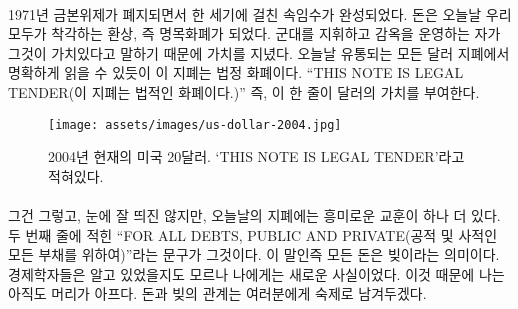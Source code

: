 \paragraph{}
\begin{comment}
	With the abolishment of the gold standard in 1971, this century-long
	sleight-of-hand was complete. Money became the illusion we all share to
	this day: fiat money. It is worth something because someone commanding
	an army and operating jails says it is wort능h something. As can be
	clearly read on every dollar note in circulation today, \enquote{THIS NOTE IS
		LEGAL TENDER}. In other words: It is valuable because the note says so.
\end{comment}
1971년 금본위제가 폐지되면서 한 세기에 걸친 속임수가 완성되었다. 
돈은 오늘날 우리 모두가 착각하는 환상, 즉 명목화폐가 되었다. 
군대를 지휘하고 감옥을 운영하는 자가 그것이 가치있다고 말하기 때문에 가치를 지녔다. 
오늘날 유통되는 모든 달러 지폐에서 명확하게 읽을 수 있듯이 이 지폐는 법정 화폐이다. 
\enquote{THIS NOTE IS LEGAL TENDER(이 지폐는 법적인 화폐이다.)}
즉, 이 한 줄이 달러의 가치를 부여한다.

\begin{comment}
	\begin{figure}
		\centering
		\texttt{[image: assets/images/us-dollar-2004.jpg]}
		\caption{A 2004 series U.S. twenty dollar note used today. `THIS NOTE IS LEGAL TENDER'}
		\label{fig:us-dollar-2004}
	\end{figure}
\end{comment}
\begin{figure}
	\centering
	\texttt{[image: assets/images/us-dollar-2004.jpg]}
	\caption{2004년 현재의 미국 20달러. `THIS NOTE IS LEGAL TENDER'라고 적혀있다.}
	\label{fig:us-dollar-2004}
\end{figure}

\paragraph{}
\begin{comment}
	By the way, there is another interesting lesson on today's bank notes,
	hidden in plain sight. The second line reads that this is legal tender
	\enquote{FOR ALL DEBTS, PUBLIC AND PRIVATE}. What might be obvious to economists
	was surprising to me: All money is debt. My head is still hurting
	because of it, and I will leave the exploration of the relation of money
	and debt as an exercise to the reader.
\end{comment}
그건 그렇고, 눈에 잘 띄진 않지만, 오늘날의 지폐에는 흥미로운 교훈이 하나 더 있다. 
두 번째 줄에 적힌 \enquote{FOR ALL DEBTS, PUBLIC AND PRIVATE(공적 및 사적인 모든 부채를 위하여)}라는 문구가 그것이다. 
이 말인즉 모든 돈은 빚이라는 의미이다. 경제학자들은 알고 있었을지도 모르나 나에게는 새로운 사실이었다. 
이것 때문에 나는 아직도 머리가 아프다. 돈과 빚의 관계는 여러분에게 숙제로 남겨두겠다.

